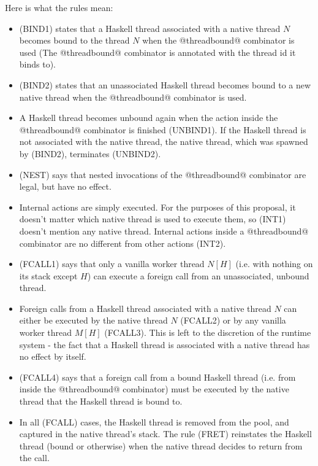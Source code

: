 \documentclass{article}
\begin{document}
Here is what the rules mean:
\begin{itemize}
\item (BIND1) states that a Haskell thread associated with a native thread $N$
becomes bound to the thread $N$ when the @threadbound@ combinator is used (The
@threadbound@ combinator is annotated with the thread id it binds to).

\item (BIND2) states that an unassociated Haskell thread becomes bound to a new
native thread when the @threadbound@ combinator is used.

\item A Haskell thread becomes unbound again when
the action inside the @threadbound@ combinator is finished (UNBIND1). If the
Haskell thread is not associated with the native thread, the native thread,
which was spawned by (BIND2), terminates (UNBIND2).

\item (NEST) says that nested invocations of the @threadbound@ combinator are
legal, but have no effect.

\item Internal actions are simply executed. For the purposes of this proposal,
it doesn't matter which native thread is used to execute them, so (INT1)
doesn't mention any native thread. Internal actions inside a @threadbound@
combinator are no different from other actions (INT2).

\item (FCALL1) says that only a vanilla worker thread $N[H]$ (i.e. with
nothing on its stack except $H$) can execute a foreign call from an
unassociated, unbound thread.
\item Foreign calls from a Haskell thread associated with a native thread $N$
can either be executed by the native thread $N$ (FCALL2) or by any vanilla
worker thread $M[H]$ (FCALL3).
This is left to the discretion of the runtime system - the fact that a Haskell
thread is associated with a native thread has no effect by itself.

\item (FCALL4) says that a foreign call from a bound Haskell thread (i.e. from
inside the @threadbound@ combinator) must be executed by the native thread that
the Haskell thread is bound to.

\item In all (FCALL) cases, the Haskell thread is removed from the pool, and
captured in the native thread's stack.  The rule (FRET) reinstates the Haskell
thread (bound or otherwise) when the native thread decides to return from the
call.


\end{itemize}
\end{document}
